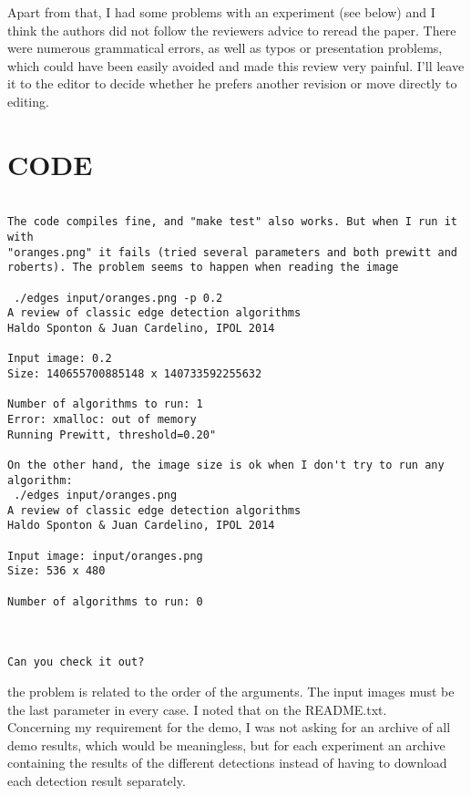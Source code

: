 \documentclass[a4paper,10pt]{report}
\begin{document}
\que Apart from that, I had some problems with an experiment (see below) and I
think the authors did not follow the reviewers advice to reread the paper.
There were numerous grammatical errors, as well as typos or presentation
problems, which could have been easily avoided and made this review very
painful.
I'll leave it to the editor to decide whether he prefers another revision or
move directly to editing.\\

\section{CODE}

\begin{verbatim}

The code compiles fine, and "make test" also works. But when I run it with
"oranges.png" it fails (tried several parameters and both prewitt and
roberts). The problem seems to happen when reading the image

 ./edges input/oranges.png -p 0.2
A review of classic edge detection algorithms
Haldo Sponton & Juan Cardelino, IPOL 2014

Input image: 0.2
Size: 140655700885148 x 140733592255632

Number of algorithms to run: 1
Error: xmalloc: out of memory
Running Prewitt, threshold=0.20"

On the other hand, the image size is ok when I don't try to run any
algorithm:
 ./edges input/oranges.png
A review of classic edge detection algorithms
Haldo Sponton & Juan Cardelino, IPOL 2014

Input image: input/oranges.png
Size: 536 x 480

Number of algorithms to run: 0



Can you check it out?

\end{verbatim}

\ans the problem is related to the order of the arguments. The input images must be the last parameter in every case. I noted that on the README.txt.\\

\que Concerning my requirement for the demo, I was not asking for an archive of
all demo results, which would be meaningless, but for each experiment an
archive containing the results of  the different detections instead of
having to download each detection result separately.\\
\end{document}
